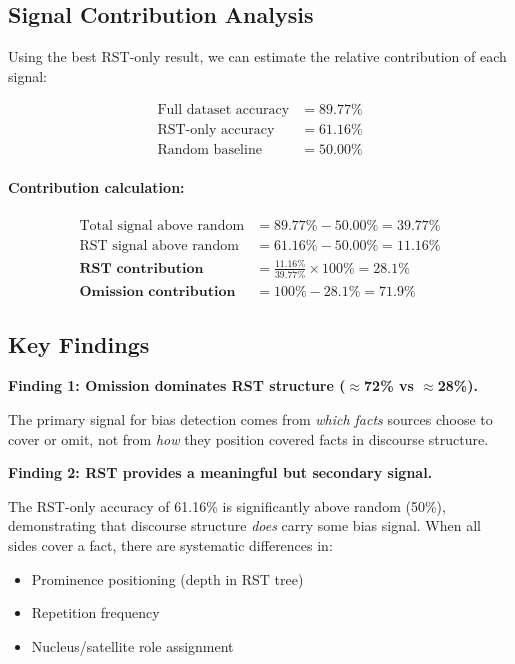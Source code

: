 \documentclass[12pt,a4paper]{article}
\begin{document}
\subsection{Signal Contribution Analysis}

Using the best RST-only result, we can estimate the relative contribution of each signal:

\begin{align*}
\text{Full dataset accuracy} &= 89.77\% \\
\text{RST-only accuracy} &= 61.16\% \\
\text{Random baseline} &= 50.00\%
\end{align*}

\paragraph{Contribution calculation:}
\begin{align*}
\text{Total signal above random} &= 89.77\% - 50.00\% = 39.77\% \\
\text{RST signal above random} &= 61.16\% - 50.00\% = 11.16\% \\[1em]
\textbf{RST contribution} &= \frac{11.16\%}{39.77\%} \times 100\% = \mathbf{28.1\%} \\
\textbf{Omission contribution} &= 100\% - 28.1\% = \mathbf{71.9\%}
\end{align*}

\subsection{Key Findings}

\textbf{Finding 1: Omission dominates RST structure ($\approx$72\% vs $\approx$28\%).}

The primary signal for bias detection comes from \textit{which facts} sources choose to cover
or omit, not from \textit{how} they position covered facts in discourse structure.

\textbf{Finding 2: RST provides a meaningful but secondary signal.}

The RST-only accuracy of 61.16\% is significantly above random (50\%), demonstrating that
discourse structure \textit{does} carry some bias signal. When all sides cover a fact, there
are systematic differences in:
\begin{itemize}
\item Prominence positioning (depth in RST tree)
\item Repetition frequency
\item Nucleus/satellite role assignment
\end{itemize}
\end{document}
